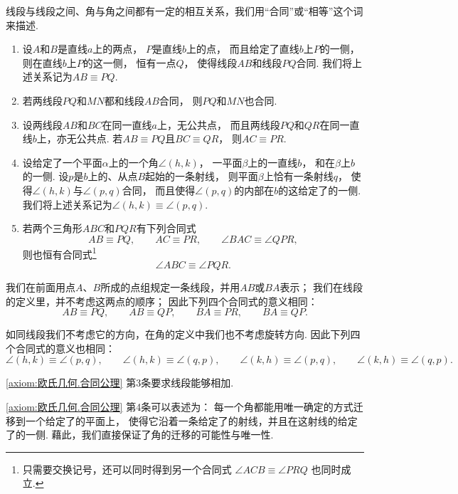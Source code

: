 \begin{axiom}[合同公理]\label{axiom:欧氏几何.合同公理}
线段与线段之间、角与角之间都有一定的相互关系，我们用“合同”或“相等”这个词来描述.
\begin{enumerate}
\item 设\(A\)和\(B\)是直线\(a\)上的两点，
\(P\)是直线\(b\)上的点，
而且给定了直线\(b\)上\(P\)的一侧，
则在直线\(b\)上\(P\)的这一侧，
恒有一点\(Q\)，
使得线段\(AB\)和线段\(PQ\)合同.
我们将上述关系记为\(AB \equiv PQ\).

\item 若两线段\(PQ\)和\(MN\)都和线段\(AB\)合同，
则\(PQ\)和\(MN\)也合同.

\item 设两线段\(AB\)和\(BC\)在同一直线\(a\)上，无公共点，
而且两线段\(PQ\)和\(QR\)在同一直线\(b\)上，亦无公共点.
若\(AB \equiv PQ\)且\(BC \equiv QR\)，
则\(AC \equiv PR\).

\item 设给定了一个平面\(\alpha\)上的一个角\(\angle(h,k)\)，
一平面\(\beta\)上的一直线\(b\)，
和在\(\beta\)上\(b\)的一侧.
设\(p\)是\(b\)上的、从点\(B\)起始的一条射线，
则平面\(\beta\)上恰有一条射线\(q\)，
使得\(\angle(h,k)\)与\(\angle(p,q)\)合同，
而且使得\(\angle(p,q)\)的内部在\(b\)的这给定了的一侧.
我们将上述关系记为\(\angle(h,k) \equiv \angle(p,q)\).

\item 若两个三角形\(ABC\)和\(PQR\)有下列合同式
\[
AB \equiv PQ, \qquad
AC \equiv PR, \qquad
\angle BAC \equiv \angle QPR,
\]
则也恒有合同式\footnote{%
只需要交换记号，还可以同时得到另一个合同式
\(\angle ACB \equiv \angle PRQ\)
也同时成立.
}
\[
\angle ABC \equiv \angle PQR.
\]
\end{enumerate}
\end{axiom}

我们在前面用点\(A\)、\(B\)所成的点组规定一条线段，并用\(AB\)或\(BA\)表示；
我们在线段的定义里，并不考虑这两点的顺序；
因此下列四个合同式的意义相同：
\[
AB \equiv PQ, \qquad
AB \equiv QP, \qquad
BA \equiv PR, \qquad
BA \equiv QP.
\]

如同线段我们不考虑它的方向，在角的定义中我们也不考虑旋转方向.
因此下列四个合同式的意义也相同：
\[
\angle(h,k) \equiv \angle(p,q), \qquad
\angle(h,k) \equiv \angle(q,p), \qquad
\angle(k,h) \equiv \angle(p,q), \qquad
\angle(k,h) \equiv \angle(q,p).
\]

\cref{axiom:欧氏几何.合同公理} 第3条要求线段能够相加.

\cref{axiom:欧氏几何.合同公理} 第4条可以表述为：
每一个角都能用唯一确定的方式迁移到一个给定了的平面上，
使得它沿着一条给定了的射线，并且在这射线的给定了的一侧.
藉此，我们直接保证了角的迁移的可能性与唯一性.

